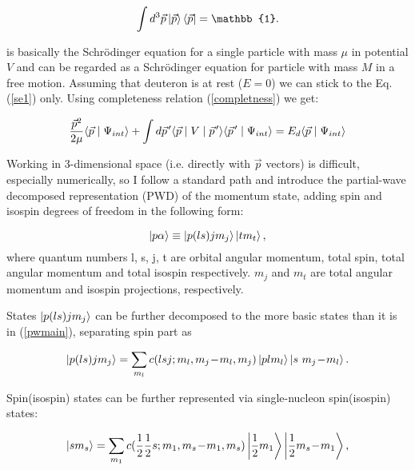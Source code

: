     \begin{equation}
        \int d^3\vec{p} \ket{\vec{p}} \bra{\vec{p}}   = \mathbb{1}.
        \label{completness}
    \end{equation}

     is basically the Schr\"{o}dinger equation for a single particle with mass $\mu$
    in potential $V$ 
    and  can be regarded as a Schr\"{o}dinger equation for particle with mass $M$ in 
    a free motion. Assuming that deuteron is at rest ($E = 0$) we can stick 
    to the Eq.(\ref{se1}) only. Using completeness relation (\ref{completness}) we get:

    \begin{equation}
        \frac{\vec{p}^2}{2\mu} \langle \vec{p} \mid \Psi_{int} \rangle +
        \int d \pvec{p} \langle \vec{p} \mid V \mid \pvec{p} \rangle
        \langle \pvec{p} \mid \Psi_{int} \rangle = 
        E_d \langle \vec{p} \mid \Psi_{int} \rangle
        \label{shrod_old}
    \end{equation}

    Working in 3-dimensional space (i.e. directly with $\vec{p}$ vectors) is difficult, especially numerically,
    so I follow a standard path and introduce the partial-wave decomposed representation (PWD) 
    of the momentum state, adding spin and isospin degrees of freedom in the following form:

    \begin{equation}
        \ket{p \alpha} \equiv \ket{p (ls) j m_j}  \ket{t m_t},
        \label{pwmain}
    \end{equation}
    where quantum numbers l, s, j, t are orbital angular momentum, total spin,
    total angular momentum and total isospin respectively. $m_j$ and $m_t$ are 
    total angular momentum and isospin projections, respectively.


    States $\ket{p (ls) j m_j}$ can be further decomposed to 
    the more basic states than it is in (\ref{pwmain}), separating spin part as 
    
    \begin{equation}
        \ket{p (ls) j m_j} = \sum_{m_l} c(lsj;m_l, m_j\!-\!m_l, m_j) \ket{p l m_l}
        \ket{s~m_j\!-\!m_l}.
        \label{full_decomp}
    \end{equation}

    Spin(isospin) states can be further represented via single-nucleon spin(isospin) states:

    \begin{equation}
        \ket{s m_s} = \sum_{m_1} c(\frac{1}{2}\frac{1}{2}s;m_1, m_s\!-\!m_1, m_s)
        \ket{\frac{1}{2} m_1}
        \ket{\frac{1}{2} m_s\!-\!m_1},
        \label{spin_decomp}
    \end{equation}

